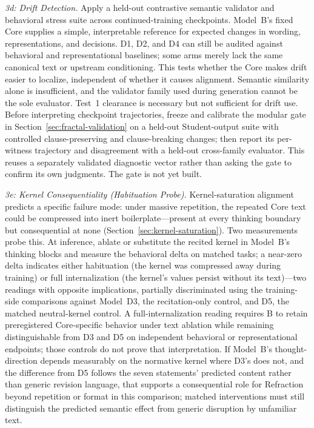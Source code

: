 \emph{3d: Drift Detection.} Apply a held-out contrastive semantic validator and
behavioral stress suite across continued-training checkpoints. Model~B's fixed
Core supplies a simple, interpretable reference for expected changes in wording,
representations, and decisions. D1, D2, and D4 can still be audited against behavioral
and representational baselines; some arms merely lack the same canonical text
or upstream conditioning. This
tests whether the Core makes drift easier to localize, independent of whether it
causes alignment. Semantic similarity alone is insufficient, and the validator
family used during generation cannot be the sole evaluator. Test~1 clearance is
necessary but not sufficient for drift use. Before interpreting checkpoint
trajectories, freeze and calibrate the modular gate in
Section~\ref{sec:fractal-validation} on a held-out Student-output suite with
controlled clause-preserving and clause-breaking changes; then report its
per-witness trajectory and disagreement with a held-out cross-family evaluator.
This reuses a separately validated diagnostic vector rather than asking the gate
to confirm its own judgments. The gate is not yet built.

\emph{3e: Kernel Consequentiality (Habituation Probe).} Kernel-saturation alignment predicts a specific failure mode: under massive repetition, the repeated Core text could be compressed into inert boilerplate---present at every thinking boundary but consequential at none (Section~\ref{sec:kernel-saturation}). Two measurements probe this. At inference, ablate or substitute the recited kernel in Model~B's thinking blocks and measure the behavioral delta on matched tasks; a near-zero delta indicates either habituation (the kernel was compressed away during training) or full internalization (the kernel's values persist without its text)---two readings with opposite implications, partially discriminated using the training-side comparisons against Model~D3, the recitation-only control, and D5, the matched neutral-kernel control. A full-internalization reading requires B to retain preregistered Core-specific behavior under text ablation while remaining distinguishable from D3 and D5 on independent behavioral or representational endpoints; those controls do not prove that interpretation. If Model~B's thought-direction depends measurably on the normative kernel where D3's does not, and the difference from D5 follows the seven statements' predicted content rather than generic revision language, that supports a consequential role for Refraction beyond repetition or format in this comparison; matched interventions must still distinguish the predicted semantic effect from generic disruption by unfamiliar text.

